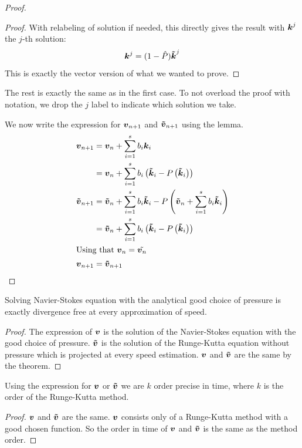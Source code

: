 \begin{proof}
\begin{proof}
With relabeling of solution if needed, this directly gives the result with ${\boldsymbol {k}}^{j}$ the $j$-th solution:
\begin{equation}
{\boldsymbol {k}}^{j}=(1-\hat{P}){\boldsymbol {\tilde{k}}}^{j}
\end{equation}
This is exactly the vector version of what we wanted to prove.
\end{proof}

The rest is exactly the same as in the first case.
To not overload the proof with notation, we drop the $j$ label to indicate which solution we take.

We now write the expression for ${\boldsymbol {v}}_{n+1}$ and ${\boldsymbol {\tilde{v}}}_{n+1}$ using the lemma.
\begin{align*}
{\boldsymbol {v}}_{n+1}&={\boldsymbol {v}}_{n}+\sum_{i=1}^{s}b_{i}{\boldsymbol {k}}_{i}\\
&={\boldsymbol {v}}_{n}+\sum_{i=1}^{s}b_{i}\left({\boldsymbol {\tilde{k}}}_{i}-P\left({\boldsymbol {\tilde{k}}}_{i}\right)\right)\\
{\boldsymbol {\tilde{v}}}_{n+1}&={\boldsymbol {\tilde{v}}}_{n}+\sum_{i=1}^{s}b_{i}{\boldsymbol {\tilde{k}}}_{i}-P\left({\boldsymbol {\tilde{v}}}_{n}+\sum_{i=1}^{s}b_{i}{\boldsymbol {\tilde{k}}}_{i}\right)\\
&={\boldsymbol {\tilde{v}}}_{n}+\sum_{i=1}^{s}b_{i}\left({\boldsymbol {\tilde{k}}}_{i}-P\left({\boldsymbol {\tilde{k}}}_{i}\right)\right)\\
\intertext{Using that ${\boldsymbol {v}}_{n}=\tilde{{\boldsymbol {v}}_{n}}$}
{\boldsymbol {v}}_{n+1}&={\boldsymbol {\tilde{v}}}_{n+1}
\end{align*}

\end{proof}

\begin{corollary}
Solving Navier-Stokes equation with the analytical good choice of pressure is exactly divergence free at every approximation of speed.
\end{corollary}
\begin{proof}
  The expression of ${\boldsymbol {v}}$ is the solution of the Navier-Stokes equation with the good choice of pressure.
  ${\boldsymbol {\tilde{v}}}$ is the solution of the Runge-Kutta equation without pressure which is projected at every speed estimation.
  ${\boldsymbol {v}}$ and ${\boldsymbol {\tilde{v}}}$ are the same by the theorem.
\end{proof}

\begin{corollary}
  Using the expression for ${\boldsymbol {v}}$ or ${\boldsymbol {\tilde{v}}}$ we are $k$ order precise in time, where $k$ is the order of the Runge-Kutta method.
\end{corollary}
\begin{proof}
  ${\boldsymbol {v}}$ and ${\boldsymbol {\tilde{v}}}$ are the same.
  ${\boldsymbol {v}}$ consists only of a Runge-Kutta method with a good chosen function.
  So the order in time of ${\boldsymbol {v}}$ and ${\boldsymbol {\tilde{v}}}$ is the same as the method order.
\end{proof}


